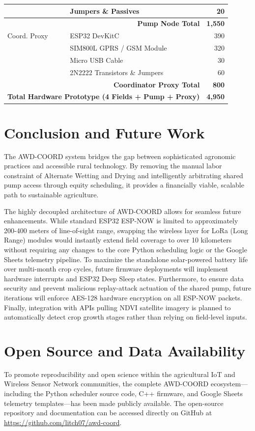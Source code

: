 \documentclass[conference]{IEEEtran}
\begin{document}
\begin{table}[htbp]
\begin{center}
\begin{tabular}{|l|l|r|}
           & Jumpers \& Passives & 20 \\
\hline
\multicolumn{2}{|r|}{\textbf{Pump Node Total}} & \textbf{1,550} \\
\hline
Coord. Proxy & ESP32 DevKitC & 390 \\
           & SIM800L GPRS / GSM Module & 320 \\
           & Micro USB Cable & 30 \\
           & 2N2222 Transistors \& Jumpers & 60 \\
\hline
\multicolumn{2}{|r|}{\textbf{Coordinator Proxy Total}} & \textbf{800} \\
\hline
\multicolumn{2}{|r|}{\textbf{Total Hardware Prototype (4 Fields + Pump + Proxy)}} & \textbf{4,950} \\
\hline
\end{tabular}
\label{tab:bom}
\end{center}
\end{table}

\section{Conclusion and Future Work}
The AWD-COORD system bridges the gap between sophisticated agronomic practices and accessible rural technology. By removing the manual labor constraint of Alternate Wetting and Drying and intelligently arbitrating shared pump access through equity scheduling, it provides a financially viable, scalable path to sustainable agriculture. 

The highly decoupled architecture of AWD-COORD allows for seamless future enhancements. While standard ESP32 ESP-NOW is limited to approximately 200-400 meters of line-of-sight range, swapping the wireless layer for LoRa (Long Range) modules would instantly extend field coverage to over 10 kilometers without requiring any changes to the core Python scheduling logic or the Google Sheets telemetry pipeline. To maximize the standalone solar-powered battery life over multi-month crop cycles, future firmware deployments will implement hardware interrupts and ESP32 Deep Sleep states. Furthermore, to ensure data security and prevent malicious replay-attack actuation of the shared pump, future iterations will enforce AES-128 hardware encryption on all ESP-NOW packets. Finally, integration with APIs pulling NDVI satellite imagery is planned to automatically detect crop growth stages rather than relying on field-level inputs.

\section*{Open Source and Data Availability}
To promote reproducibility and open science within the agricultural IoT and Wireless Sensor Network communities, the complete AWD-COORD ecosystem---including the Python scheduler source code, C++ firmware, and Google Sheets telemetry templates---has been made publicly available. The open-source repository and documentation can be accessed directly on GitHub at \url{https://github.com/litch07/awd-coord}.
\end{document}
